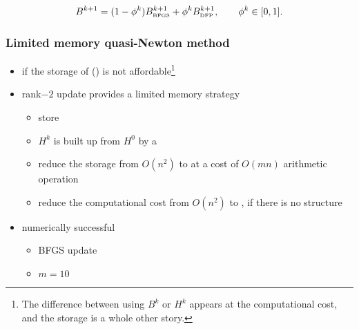 	\bigskip
	
	\begin{eqnarray*}
		B^{k+1} = (1-\phi^k) B^{k+1}_{\tiny\mbox{BFGS}} + \phi^k B^{k+1}_{\tiny\mbox{DFP}},\qquad \phi^k\in[0,1].
	\end{eqnarray*}
	\clr{\footnotesize $\phi^k\in[0,1)$ same convergence property with BFGS.}


	\subsubsection{Limited memory quasi-Newton method}
	\begin{itemize}
		\item if the storage of  () is not affordable\footnote{
		The difference between using $B^k$ or $H^k$ appears at the computational cost, and the storage
	    is a whole other story.}
		\item rank$-2$ update provides a limited memory strategy
		\begin{itemize}
			\item store \\[1mm]
			\item $H^k$ is built up from $H^0$ by a \\[1mm]
			\item reduce the storage from $O(n^2)$ to  at a cost of $O(mn)$ arithmetic operation\\[1mm]
			\item reduce the computational cost from $O(n^2)$ to , if there is no structure
		\end{itemize}
		\item numerically successful
		\begin{itemize}
			\item BFGS update\\[1mm]
			\item $m=10$\\[2mm]
		\end{itemize}
	\end{itemize}


